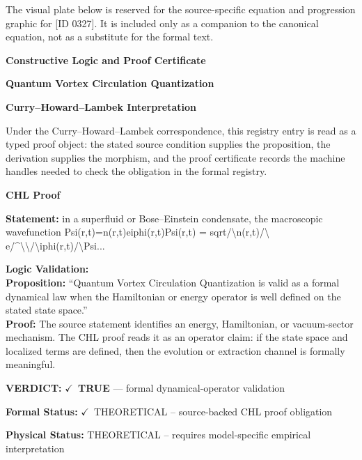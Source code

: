 \begingroup\footnotesize\sloppy
The visual plate below is reserved for the source-specific equation and progression graphic for [ID 0327]. It is included only as a companion to the canonical equation, not as a substitute for the formal text.
\par\endgroup
\ifTZPDarkEdition
{}
\fi

\clearpage
\begingroup\tzpsupportsetup
\noindent\textbf{\fontsize{10.8pt}{12.8pt}\selectfont [ID 0327] Constructive Logic and Proof Certificate}\par
\noindent\textbf{\fontsize{10pt}{12pt}\selectfont Quantum Vortex Circulation Quantization}\par
\vspace{0.45em}
\begingroup
\footnotesize
\setlength{\parskip}{0.22em}
\setlength{\parindent}{0pt}
\noindent\textbf{Curry--Howard--Lambek Interpretation}\par
Under the Curry--Howard--Lambek correspondence, this registry entry is read as a typed proof
object: the stated source condition supplies the proposition, the derivation supplies the
morphism, and the proof certificate records the machine handles needed to check the obligation
in the formal registry.

\vspace{0.45em}
\noindent\textbf{CHL Proof}\par
\textbf{Statement:} in a superfluid or Bose--Einstein condensate, the macroscopic wavefunction
Psi(r,t)=n(r,t)eiphi(r,t)Psi(r,t) = sqrt/\textbackslash{}n(r,t)/\textbackslash{} e/\textasciicircum{}\textbackslash{}\textbackslash{}/\textbackslash{}iphi(r,t)/\textbackslash{}Psi...

\textbf{Logic Validation:}\\
\textbf{Proposition:} ``Quantum Vortex Circulation Quantization is valid as a formal dynamical law when the
Hamiltonian or energy operator is well defined on the stated state space.''\\
\textbf{Proof:} The source statement identifies an energy, Hamiltonian, or vacuum-sector mechanism. The
CHL proof reads it as an operator claim: if the state space and localized terms are
defined, then the evolution or extraction channel is formally meaningful.

\textbf{VERDICT:} \ensuremath{\checkmark}\ \textbf{TRUE} --- formal dynamical-operator validation

\textbf{Formal Status:} \ensuremath{\checkmark}\ THEORETICAL -- source-backed CHL proof obligation

\textbf{Physical Status:} THEORETICAL -- requires model-specific empirical interpretation
\par\vspace{0.45em}
\par
\ifTZPDarkEdition
{}
\fi
\endgroup
\endgroup
